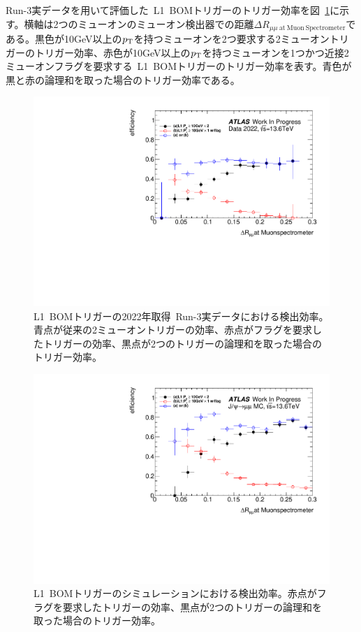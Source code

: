 Run-3実データを用いて評価した~L1~BOMトリガーのトリガー効率を図~\ref{fig:L1BOMEffData}に示す。横軸は2つのミューオンのミューオン検出器での距離$\Delta R_{\mu\mu~\mathrm{at~Muon~Spectrometer}}$である。黒色が10GeV以上の$p_\mathrm{T}$を持つミューオンを2つ要求する2ミューオントリガーのトリガー効率、赤色が10GeV以上の$p_\mathrm{T}$を持つミューオンを1つかつ近接2ミューオンフラグを要求する~L1~BOMトリガーのトリガー効率を表す。青色が黒と赤の論理和を取った場合のトリガー効率である。

\begin{figure}[H]
    \centering
    \includegraphics[clip, width=12cm]{fig/4/BOM_eff.pdf}
    \caption{L1~BOMトリガーの2022年取得~Run-3実データにおける検出効率。青点が従来の2ミューオントリガーの効率、赤点がフラグを要求したトリガーの効率、黒点が2つのトリガーの論理和を取った場合のトリガー効率。}
    \label{fig:L1BOMEffData}
\end{figure}

\begin{figure}[H]
    \centering
    \includegraphics[clip, width=12cm]{fig/4/BOM_MC_eff.pdf}
    \caption{L1~BOMトリガーのシミュレーションにおける検出効率。赤点がフラグを要求したトリガーの効率、黒点が2つのトリガーの論理和を取った場合のトリガー効率。}
    \label{fig:L1BOMEffMC}
\end{figure}

